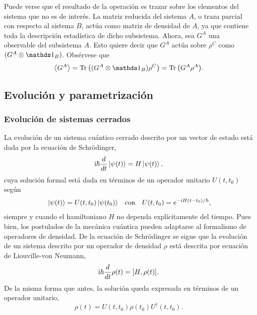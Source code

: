 
Puede verse que el resultado de la operación es trazar sobre los elementos del sistema que no es de interés. La matriz reducida del sistema $A$, o traza parcial con respecto al sistema $B$, actúa como matriz de densidad de $A$, ya que contiene toda la descripción estadística de dicho subsistema. Ahora, sea $G^{A}$ una observable del subsistema $A$. Esto quiere decir que $G^{A}$ actúa sobre $\rho^{C}$ como $(G^{A}\otimes \Id_{B})$. Obsérvese que
\begin{equation}
    \expval{G^{A}}=\Tr\qty((G^A\otimes \Id_B)\rho^C)=\Tr \qty( G^A \rho^A ).\nonumber
\end{equation}

\subsection{Evolución y parametrización}
\label{subsec:ch2_evol_param}


\subsubsection{Evolución de sistemas cerrados}

La evolución de un sistema cuántico cerrado descrito por un vector de estado está dada por la ecuación de Schrödinger,
\begin{equation}
    \text{i}\hbar\frac{d}{dt}\ket{\psi(t)}=H\ket{\psi(t)},\nonumber
\end{equation}
cuya solución formal está dada en términos de un operador unitario $U(t,t_{0})$ según
\begin{align}
    \ket{\psi(t)}=U(t,t_{0})\ket{\psi(t_{0})} && \text{con} && U(t,t_{0})=e^{-\rmi H(t-t_{0})/\hbar}\rlap{,}\nonumber
\end{align}
siempre y cuando el hamiltoniano $H$ no dependa explícitamente del tiempo. Pues bien, los postulados de la mecánica cuántica pueden adaptarse al formalismo de operadores de densidad. De la ecuación de Schrödinger se sigue que la evolución de un sistema descrito por un operador de densidad $\rho$ está descrita por ecuación de Liouville-von Neumann,
\begin{equation}
    \text{i}\hbar\frac{d}{d t} \rho(t)=[H,\rho(t)].\nonumber
\end{equation}
De la misma forma que antes, la solución queda expresada en términos de un operador unitario,
\begin{equation}
    \rho(t)=U(t,t_{0})\rho(t_{0})U^{\dagger}(t,t_{0}).\nonumber
\end{equation}

